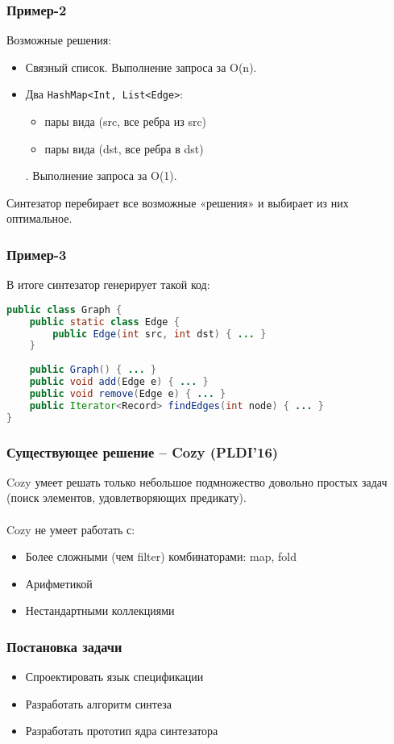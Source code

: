 \documentclass[14pt]{beamer}
\begin{document}
\begin{frame}[fragile]
\frametitle{Пример-2}
Возможные решения:
\begin{itemize}
    \item Связный список. Выполнение запроса за O(n).
    \item Два \texttt{HashMap<Int, List<Edge>}:
    \begin{itemize}
        \item пары вида (src, все ребра из src)
        \item пары вида (dst, все ребра в dst)
    \end{itemize}.
    Выполнение запроса за O(1).
\end{itemize}
Синтезатор перебирает все возможные «решения» и выбирает из них оптимальное.
\end{frame}

\begin{frame}[fragile]
\frametitle{Пример-3}
В итоге синтезатор генерирует такой код:
\begin{lstlisting}[language=Java]
public class Graph {
    public static class Edge {
        public Edge(int src, int dst) { ... }
    }
    
    public Graph() { ... }
    public void add(Edge e) { ... }
    public void remove(Edge e) { ... }
    public Iterator<Record> findEdges(int node) { ... }
}
\end{lstlisting}

\end{frame}


\begin{frame}
\frametitle{Существующее решение -- Cozy (PLDI'16)}
Cozy умеет решать только небольшое подмножество довольно простых задач (поиск элементов, удовлетворяющих предикату).\\ \\
Cozy не умеет работать с:
\begin{itemize}
\item Более сложными (чем filter) комбинаторами: map, fold
\item Арифметикой
\item Нестандартными коллекциями
\end{itemize}
\end{frame}


\begin{frame}
\frametitle{Постановка задачи}
\begin{itemize}
    \item Спроектировать язык спецификации
    \item Разработать алгоритм синтеза
    \item Разработать прототип ядра синтезатора
\end{itemize}
\end{frame}
\end{document}
